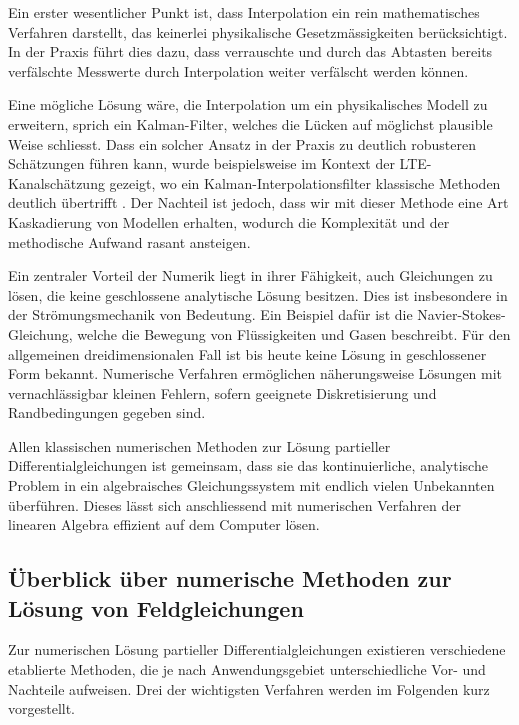 Ein erster wesentlicher Punkt ist, dass Interpolation ein rein mathematisches Verfahren darstellt, das keinerlei physikalische Gesetzmässigkeiten berücksichtigt.
In der Praxis führt dies dazu, dass verrauschte und durch das Abtasten bereits verfälschte Messwerte durch Interpolation weiter verfälscht werden können.

Eine mögliche Lösung wäre, die Interpolation um ein physikalisches Modell zu erweitern, sprich ein Kalman-Filter, welches die Lücken auf möglichst plausible Weise schliesst.
Dass ein solcher Ansatz in der Praxis zu deutlich robusteren Schätzungen führen kann, wurde beispielsweise im Kontext der LTE-Kanalschätzung gezeigt, wo ein Kalman-Interpolationsfilter klassische Methoden deutlich übertrifft \cite{parallelisierung:Dai2012}.
%
%
Der Nachteil ist jedoch, dass wir mit dieser Methode eine Art Kaskadierung von Modellen erhalten, wodurch die Komplexität und der methodische Aufwand rasant ansteigen.
%

Ein zentraler Vorteil der Numerik liegt in ihrer Fähigkeit, auch Gleichungen zu lösen, die keine geschlossene analytische Lösung besitzen.
%
Dies ist insbesondere in der Strömungsmechanik von Bedeutung.
Ein Beispiel dafür ist die Navier-Stokes-Gleichung, welche die Bewegung von Flüssigkeiten und Gasen beschreibt.
%
Für den allgemeinen dreidimensionalen Fall ist bis heute keine Lösung in geschlossener Form bekannt.
Numerische Verfahren ermöglichen näherungsweise Lösungen mit vernachlässigbar kleinen Fehlern, sofern geeignete Diskretisierung und Randbedingungen gegeben sind.

Allen klassischen numerischen Methoden zur Lösung partieller Differentialgleichungen ist gemeinsam, dass sie das kontinuierliche, analytische Problem in ein algebraisches Gleichungssystem mit endlich vielen Unbekannten überführen.
Dieses lässt sich anschliessend mit numerischen Verfahren der linearen Algebra effizient auf dem Computer lösen.

\subsection{Überblick über numerische Methoden zur Lösung von Feldgleichungen}

Zur numerischen Lösung partieller Differentialgleichungen existieren verschiedene etablierte Methoden, die je nach Anwendungsgebiet unterschiedliche Vor- und Nachteile aufweisen.
Drei der wichtigsten Verfahren werden im Folgenden kurz vorgestellt.

